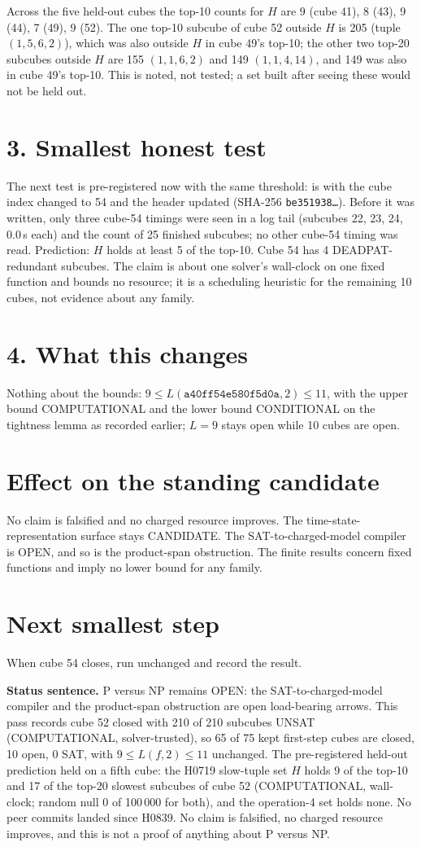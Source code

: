 \documentclass[11pt]{article}
\begin{document}
Across the five held-out cubes the top-10 counts for $H$ are 9 (cube 41), 8 (43), 9 (44), 7 (49), 9 (52). The one top-10 subcube of cube 52 outside $H$ is 205 (tuple $(1,5,6,2)$), which was also outside $H$ in cube 49's top-10; the other two top-20 subcubes outside $H$ are 155 $(1,1,6,2)$ and 149 $(1,1,4,14)$, and 149 was also in cube 49's top-10. This is noted, not tested; a set built after seeing these would not be held out.

\section*{3. Smallest honest test}
The next test is pre-registered now with the same threshold:  is  with the cube index changed to 54 and the header updated (SHA-256 \texttt{be351938\ldots}). Before it was written, only three cube-54 timings were seen in a log tail (subcubes 22, 23, 24, 0.0\,s each) and the count of 25 finished subcubes; no other cube-54 timing was read. Prediction: $H$ holds at least 5 of the top-10. Cube 54 has 4 DEADPAT-redundant subcubes. The claim is about one solver's wall-clock on one fixed function and bounds no resource; it is a scheduling heuristic for the remaining 10 cubes, not evidence about any family.

\section*{4. What this changes}
Nothing about the bounds: $9\le L(\texttt{a40ff54e580f5d0a},2)\le 11$, with the upper bound COMPUTATIONAL and the lower bound CONDITIONAL on the tightness lemma as recorded earlier; $L=9$ stays open while 10 cubes are open.

\section*{Effect on the standing candidate}
No claim is falsified and no charged resource improves. The time-state-representation surface stays CANDIDATE. The SAT-to-charged-model compiler is OPEN, and so is the product-span obstruction. The finite results concern fixed functions and imply no lower bound for any family.

\section*{Next smallest step}
When cube 54 closes, run  unchanged and record the result.

\bigskip
\noindent\textbf{Status sentence.} P versus NP remains OPEN: the SAT-to-charged-model compiler and the product-span obstruction are open load-bearing arrows. This pass records cube 52 closed with 210 of 210 subcubes UNSAT (COMPUTATIONAL, solver-trusted), so 65 of 75 kept first-step cubes are closed, 10 open, 0 SAT, with $9\le L(f,2)\le 11$ unchanged. The pre-registered held-out prediction held on a fifth cube: the H0719 slow-tuple set $H$ holds 9 of the top-10 and 17 of the top-20 slowest subcubes of cube 52 (COMPUTATIONAL, wall-clock; random null 0 of 100\,000 for both), and the operation-4 set holds none. No peer commits landed since H0839. No claim is falsified, no charged resource improves, and this is not a proof of anything about P versus NP.
\end{document}
